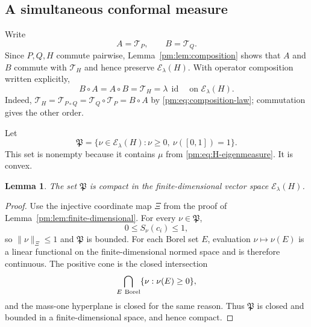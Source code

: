 \documentclass[11pt]{article}
\newtheorem{lemma}[theorem]{Lemma}
\theoremstyle{definition}
\theoremstyle{remark}
\newcommand{\I}{[0,1]}
\newcommand{\id}{\operatorname{id}}
\newcommand{\T}{\mathcal T}
\begin{document}
\subsection{A simultaneous conformal measure}

Write
\[
 A=\T_P,\qquad B=\T_Q.
\]
Since $P,Q,H$ commute pairwise, Lemma~\ref{pm:lem:composition} shows that
$A$ and $B$ commute with $\T_H$ and hence preserve
$\mathscr E_\lambda(H)$.  With operator composition written explicitly,
\begin{equation}\label{pm:eq:AB-lambda}
 B\circ A=A\circ B=\T_H=\lambda\,\id
 \quad\text{on }\mathscr E_\lambda(H).
\end{equation}
Indeed, $\T_H=\T_{P\circ Q}=\T_Q\circ\T_P=B\circ A$ by
\eqref{pm:eq:composition-law}; commutation gives the other order.

Let
\[
 \mathfrak P
 =\{\nu\in\mathscr E_\lambda(H):
       \nu\geq0,\ \nu(\I)=1\}.
\]
This set is nonempty because it contains $\mu$ from
\eqref{pm:eq:H-eigenmeasure}.  It is convex.

\begin{lemma}\label{pm:lem:compact-slice}
The set $\mathfrak P$ is compact in the finite-dimensional vector space
$\mathscr E_\lambda(H)$.
\end{lemma}

\begin{proof}
Use the injective coordinate map $\Xi$ from the proof of
Lemma~\ref{pm:lem:finite-dimensional}.  For every $\nu\in\mathfrak P$,
\[
 0\leq S_\nu(c_i)\leq1,
\]
so $\|\nu\|_\Xi\leq1$ and $\mathfrak P$ is bounded.  For each Borel set
$E$, evaluation $\nu\mapsto\nu(E)$ is a linear functional on the
finite-dimensional normed space and is therefore continuous.  The positive
cone is the closed intersection
\[
 \bigcap_{E\ {\rm Borel}}\{\nu:\nu(E)\geq0\},
\]
and the mass-one hyperplane is closed for the same reason.  Thus
$\mathfrak P$ is closed and bounded in a finite-dimensional space, and
hence compact.
\end{proof}
\end{document}
